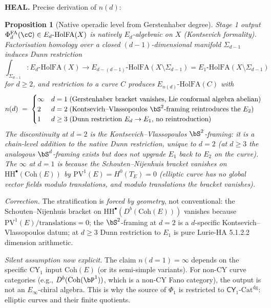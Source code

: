 \documentclass[11pt]{article}
\newtheorem{proposition}[theorem]{Proposition}
\theoremstyle{definition}
\providecommand{\CY}{\mathsf{CY}}
\providecommand{\PhiFA}{\Phi^{\mathrm{FA}}}
\providecommand{\EdHolFA}{E_d\text{-}\mathrm{HolFA}}
\providecommand{\HolFA}{\mathrm{HolFA}}
\providecommand{\HH}{\mathrm{HH}}
\providecommand{\Eone}{E_1}
\providecommand{\Coh}{\mathrm{Coh}}
\providecommand{\PV}{\mathrm{PV}}
\begin{document}
\smallskip
\noindent\textbf{HEAL.}  Precise derivation of $n(d)$:

\begin{proposition}[Native operadic level from Gerstenhaber degree]
\label{prop:native-en-heal}
Stage 1 output $\PhiFA_d(\cC) \in \EdHolFA(X)$ is
natively $E_d$-algebraic on $X$ (Kontsevich formality).  Factorisation
homology over a closed $(d-1)$-dimensional manifold
$\Sigma_{d-1}$ induces Dunn restriction
\[
 \int_{\Sigma_{d-1}}\colon \EdHolFA(X) \to E_{d - (d-1)}\text{-}\HolFA(X \setminus \Sigma_{d-1}) = \Eone\text{-}\HolFA(X \setminus \Sigma_{d-1})
\]
for $d \geq 2$, and restriction to a curve $C$ produces
$E_{n(d)}\text{-}\HolFA(C)$ with
\[
 n(d) \;=\; \begin{cases}
 \infty & d = 1\; (\text{Gerstenhaber bracket vanishes,\ Lie conformal algebra abelian}) \\
 2 & d = 2\; (\text{Kontsevich--Vlassopoulos\ $\bS^2$-framing reintroduces the\ $E_2$}) \\
 1 & d \geq 3\; (\text{Dunn restriction\ $E_d \to E_1$,\ no reintroduction})
 \end{cases}
\]
The discontinuity at $d = 2$ is the Kontsevich--Vlassopoulos
$\bS^2$-framing: it is a \emph{chain-level} addition to the native
Dunn restriction, unique to $d = 2$ (at $d \geq 3$ the analogous
$\bS^d$-framing exists but does not upgrade $E_1$ back to $E_2$ on the
curve). The $\infty$ at $d = 1$ is because the Schouten--Nijenhuis
bracket vanishes on $\HH^\bullet(\Coh(E))$ by
$\PV^1(E) = H^0(T_E) = 0$ (elliptic curve has no global vector
fields modulo translations, and modulo translations the bracket
vanishes).
\end{proposition}

\emph{Correction.} The stratification is \emph{forced by geometry}, not
conventional: the Schouten--Nijenhuis bracket on
$\HH^\bullet(D^b(\Coh(E)))$ vanishes because $\PV^1(E)/\text{translations} = 0$;
the $\bS^2$-framing at $d = 2$ is a $d$-specific Kontsevich--Vlassopoulos
datum; at $d \geq 3$ Dunn restriction to $E_1$ is pure Lurie-HA 5.1.2.2
dimension arithmetic.

\smallskip
\emph{Silent assumption now explicit.}  The claim
$n(d = 1) = \infty$ depends on the specific CY$_1$ input
$\Coh(E)$ (or its semi-simple variants). For non-CY curve categories
(e.g., $D^b(\Coh(\bP^1))$, which is a non-CY Fano category), the
output is not an $E_\infty$-chiral algebra. This is why the source of
$\Phi_1$ is restricted to $\CY_1\text{-}\mathrm{Cat}^{\mathrm{dg}}$:
elliptic curves and their finite quotients.
\end{document}
